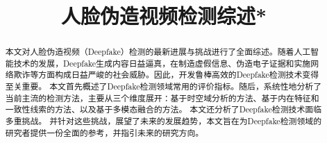 \documentclass[conference]{IEEEtran}
\begin{document}
\title{人脸伪造视频检测综述*\\
}

\author{
}

\maketitle

\begin{abstract}
本文对人脸伪造视频（Deepfake）检测的最新进展与挑战进行了全面综述。随着人工智能技术的发展，Deepfake生成内容日益逼真，在制造虚假信息、伪造电子证据和实施网络欺诈等方面构成日益严峻的社会威胁。因此，开发鲁棒高效的Deepfake检测技术变得至关重要。
本文首先概述了Deepfake检测领域常用的评价指标。随后，系统性地分析了当前主流的检测方法，主要从三个维度展开：基于时空域分析的方法、基于内在特征和一致性线索的方法、以及基于多模态融合的方法。
本文还分析了Deepfake检测技术面临多重挑战。
并针对这些挑战，展望了未来的发展趋势，本文旨在为Deepfake检测领域的研究者提供一份全面的参考，并指引未来的研究方向。
\end{abstract}
\end{document}
